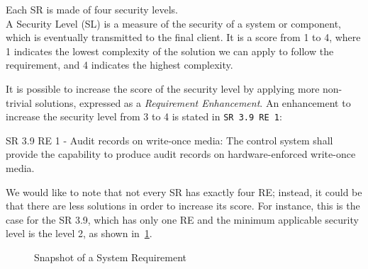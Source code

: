 Each SR is made of four security levels. \\
A Security Level (SL) is a measure of the security of a system or component, which is eventually transmitted to the final client. It is a score from 1 to 4, where 1 indicates the lowest complexity of the solution we can apply to follow the requirement, and 4 indicates the highest complexity.~\cite{ixon-practical-guide-iec-62443}

It is possible to increase the score of the security level by applying more non-trivial solutions, expressed as a \textit{Requirement Enhancement}. An enhancement to increase the security level from 3 to 4 is stated in \texttt{SR 3.9 RE 1}:
\begin{mdframed}
  SR 3.9 RE 1 - Audit records on write-once media: The control system shall provide the capability to produce audit records on hardware-enforced write-once media.
\end{mdframed}\label{sr:3-3_3-9_re1}

We would like to note that not every SR has exactly four RE; instead, it could be that there are less solutions in order to increase its score. For instance, this is the case for the SR 3.9, which has only one RE and the minimum applicable security level is the level 2, as shown in~\cref{fig:iec62443_3-3_3_9}.

\begin{figure}[t]
  \centering
  \caption[Snapshot of a System Requirement]{Snapshot of a System Requirement}
  \label{fig:iec62443_3-3_3_9}
\end{figure}

